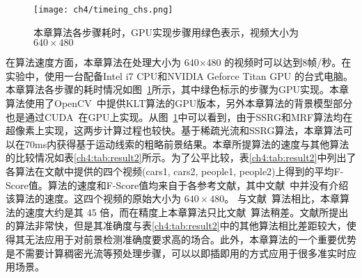\begin{figure}[!htbp]
\begin{center}
  \texttt{[image: ch4/timeing\_chs.png]}

\end{center}

\caption{本章算法各步骤耗时，GPU实现步骤用绿色表示，视频大小为 $640\times480$}
\label{ch4:fig:timing}       %
\end{figure}
在算法速度方面，本章算法在处理大小为 640$\times$480 的视频时可以达到8帧/秒。在实验中，使用一台配备Intel i7 CPU和NVIDIA Geforce Titan GPU 的台式电脑。本章算法各步骤的耗时情况如图~\ref{ch4:fig:timing}所示，其中绿色标示的步骤为GPU实现。本章算法使用了OpenCV~\cite{opencv_library}中提供KLT算法的GPU版本，另外本章算法的背景模型部分也是通过CUDA~\cite{CUDA}在GPU上实现。从图~\ref{ch4:fig:timing}中可以看到，由于SSRG和MRF算法均在超像素上实现，这两步计算过程也较快。基于稀疏光流和SSRG算法，本章算法可以在70ms内获得基于运动线索的粗略前景结果。本章所提算法的速度与其他算法的比较情况如表\ref{ch4:tab:result2}所示。为了公平比较，表\ref{ch4:tab:result2}中列出了各算法在文献中提供的四个视频(cars1, cars2, people1, people2)上得到的平均F-Score值。算法的速度和F-Score值均来自于各参考文献，其中文献~中并没有介绍该算法的速度。这四个视频的原始大小为 $640\times480$。 与文献~算法相比，本章算法的速度大约是其 45 倍，而在精度上本章算法只比文献~算法稍差。文献所提出的算法非常快，但是其准确度与表\ref{ch4:tab:result2}中的其他算法相比差距较大，使得其无法应用于对前景检测准确度要求高的场合。此外，本章算法的一个重要优势是不需要计算稠密光流等预处理步骤，可以以即插即用的方式应用于很多准实时应用场景。
